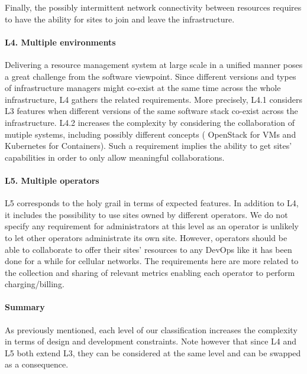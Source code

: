 Finally, the possibly intermittent network connectivity between \edge resources
requires to have the ability for sites to join and leave the
infrastructure.


\vspace*{-.3cm}
\paragraph{L4. Multiple \cloud environments}
Delivering a resource management system at large scale in a unified manner %
poses a great challenge from the software viewpoint. Since different versions and types
of infrastructure managers might co-exist at the same time across the whole
infrastructure, L4 gathers the related requirements.
%
More precisely, L4.1 considers L3 features when different versions of the same software stack co-exist across the infrastructure.
%
L4.2 increases the complexity by considering  the collaboration of mutiple systems, including possibly different concepts (\eg
OpenStack for VMs and Kubernetes for Containers).
%
Such a requirement implies the ability to get sites' capabilities in order to
only allow meaningful collaborations.

\vspace*{-.3cm}
\paragraph{L5. Multiple operators}
L5 corresponds to the holy grail in terms of expected features. In addition to
L4, it includes the possibility to use sites owned by different operators. %
We do not specify any requirement for
administrators at this level as an operator is unlikely to let other operators administrate
its own site. However, operators should be able to collaborate to offer their
sites' resources to any DevOps like it has been done for a while for cellular
networks. The requirements here are more related to the collection and sharing of
relevant metrics enabling each operator to perform charging/billing.

\vspace*{-.3cm}
\paragraph{Summary}
As previously mentioned, each level of our classification increases the
complexity in terms of design and development constraints. Note however that
since L4 and L5 both extend L3, they can be considered at the same level and
can be swapped as a consequence.

